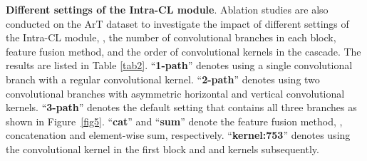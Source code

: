 \textbf{Different settings of the Intra-CL module}. Ablation studies are also conducted on the ArT dataset to investigate the impact of different settings of the Intra-CL module, , the number of convolutional branches in each block, feature fusion method, and the order of convolutional kernels in the cascade. The results are listed in Table \ref{tab2}. ``\textbf{1-path}'' denotes using a single convolutional branch with a regular  convolutional kernel. ``\textbf{2-path}'' denotes using two convolutional branches with asymmetric horizontal and vertical convolutional kernels. ``\textbf{3-path}'' denotes the default setting that contains all three branches as shown in Figure~\ref{fig5}. ``\textbf{cat}'' and ``\textbf{sum}'' denote the feature fusion method, , concatenation and element-wise sum, respectively. ``\textbf{kernel:753}'' denotes using the  convolutional kernel in the first block and  and  kernels subsequently. 



\begin{table}
\begin{center}
  \caption{Ablation study of different settings of the Intra-CL module on the ArT dataset.}
   \vspace{-1mm}
  \label{tab3}
 \vspace{-2mm}
\end{center}
\end{table}

